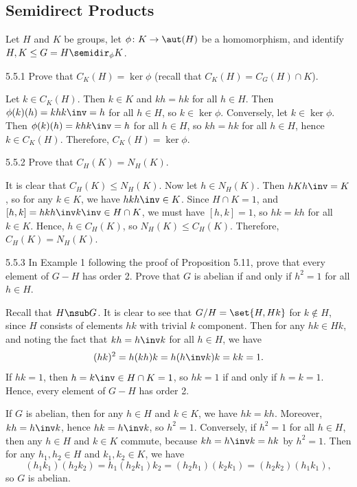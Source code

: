 \subsection{Semidirect Products}

Let $H$ and $K$ be groups, let $\phi \colon K \to \aut(H)$ be a homomorphism, and identify $H, K \leq G = H \semidir_\phi K$.

\begin{exercise}{5.5.1}
    Prove that $C_K(H) = \ker\phi$ (recall that $C_K(H) = C_G(H) \cap K$).
\end{exercise}

\begin{sol}
    Let $k \in C_K(H)$.
	Then $k \in K$ and $kh = hk$ for all $h \in H$.
	Then $\phi(k)(h) = khk\inv = h$ for all $h \in H$, so $k \in \ker\phi$.
	Conversely, let $k \in \ker\phi$.
	Then $\phi(k)(h) = khk\inv = h$ for all $h \in H$, so $kh = hk$ for all $h \in H$, hence $k \in C_K(H)$.
	Therefore, $C_K(H) = \ker\phi$.
\end{sol}

\begin{exercise}{5.5.2}
    Prove that $C_H(K) = N_H(K)$.
\end{exercise}

\begin{sol}
    It is clear that $C_H(K) \leq N_H(K)$.
	Now let $h \in N_H(K)$.
	Then $hKh\inv = K$, so for any $k \in K$, we have $hkh\inv \in K$.
	Since $H \cap K = 1$, and $[h, k] = hkh\inv k\inv \in H \cap K$, we must have $[h, k] = 1$, so $hk = kh$ for all $k \in K$.
	Hence, $h \in C_H(K)$, so $N_H(K) \leq C_H(K)$.
	Therefore, $C_H(K) = N_H(K)$.
\end{sol}

\begin{exercise}{5.5.3}
    In Example 1 following the proof of Proposition 5.11, prove that every element of $G - H$ has order 2.
	Prove that $G$ is abelian if and only if $h^2 = 1$ for all $h \in H$.
\end{exercise}

\begin{sol}
    Recall that $H \nsub G$.
	It is clear to see that $G/H = \set{H, Hk}$ for $k \notin H$, since $H$ consists of elements $hk$ with trivial $k$ component.
	Then for any $hk \in Hk$, and noting the fact that $kh = h\inv k$ for all $h \in H$, we have
    \[
    	(hk)^2 = h(kh)k = h(h\inv k)k = kk = 1.
    \]
    If $hk = 1$, then $h = k\inv \in H \cap K = 1$, so $hk = 1$ if and only if $h = k = 1$.
	Hence, every element of $G - H$ has order 2.

    If $G$ is abelian, then for any $h \in H$ and $k \in K$, we have $hk = kh$.
	Moreover, $kh = h\inv k$, hence $hk = h\inv k$, so $h^2 = 1$.
	Conversely, if $h^2 = 1$ for all $h \in H$, then any $h \in H$ and $k \in K$ commute, because $kh = h\inv k = hk$ by $h^2 = 1$.
	Then for any $h_1, h_2 \in H$ and $k_1, k_2 \in K$, we have
    \[
    	(h_1k_1)(h_2k_2) = h_1(h_2k_1)k_2 = (h_2h_1)(k_2k_1) = (h_2k_2)(h_1k_1),
    \]
    so $G$ is abelian.
\end{sol}

